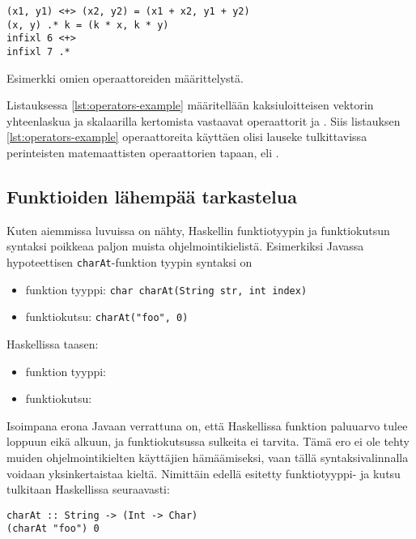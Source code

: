\begin{listing}[H]
\begin{verbatim}
(x1, y1) <+> (x2, y2) = (x1 + x2, y1 + y2)
(x, y) .* k = (k * x, k * y)
infixl 6 <+>
infixl 7 .*
\end{verbatim}
\label{lst:operators-example}
\caption{Esimerkki omien operaattoreiden määrittelystä.}
\end{listing}

Listauksessa \ref{lst:operators-example} määritellään kaksiuloitteisen vektorin yhteenlaskua
ja skalaarilla kertomista vastaavat operaattorit \Haskell{<+>} ja .
Siis listauksen \ref{lst:operators-example} operaattoreita käyttäen olisi lauseke
 tulkittavissa perinteisten matemaattisten operaattorien tapaan,
eli .

\iffalse
\subsection{Funktioiden lähempää tarkastelua}
Kuten aiemmissa luvuissa on nähty,
Haskellin funktiotyypin ja funktiokutsun syntaksi poikkeaa paljon muista ohjelmointikielistä.
Esimerkiksi Javassa hypoteettisen \texttt{charAt}-funktion tyypin syntaksi on

\begin{itemize}
    \item funktion tyyppi: \texttt{char charAt(String str, int index)}
    \item funktiokutsu: \texttt{charAt("foo", 0)}
\end{itemize}
Haskellissa taasen:
\begin{itemize}
    \item funktion tyyppi: 
    \item funktiokutsu: 
\end{itemize}

Isoimpana erona Javaan verrattuna on, että Haskellissa funktion paluuarvo tulee loppuun eikä alkuun,
ja funktiokutsussa sulkeita ei tarvita.
Tämä ero ei ole tehty muiden ohjelmointikielten käyttäjien hämäämiseksi,
vaan tällä syntaksivalinnalla voidaan yksinkertaistaa kieltä.
Nimittäin edellä esitetty funktiotyyppi- ja kutsu tulkitaan Haskellissa seuraavasti:

\begin{verbatim}
charAt :: String -> (Int -> Char)
(charAt "foo") 0
\end{verbatim}

